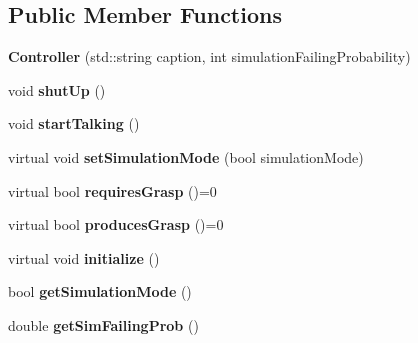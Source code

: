 \subsection*{Public Member Functions}
\begin{DoxyCompactItemize}
\item 
\hypertarget{classkukadu_1_1Controller_a127838e5505d9d35c68da8d95b9d1cda}{{\bfseries Controller} (std\-::string caption, int simulation\-Failing\-Probability)}\label{classkukadu_1_1Controller_a127838e5505d9d35c68da8d95b9d1cda}

\item 
\hypertarget{classkukadu_1_1Controller_aa27eb73a93a2d59bc0ebe15baf28bea0}{void {\bfseries shut\-Up} ()}\label{classkukadu_1_1Controller_aa27eb73a93a2d59bc0ebe15baf28bea0}

\item 
\hypertarget{classkukadu_1_1Controller_a1973596dea74a0706e275f044ca190b0}{void {\bfseries start\-Talking} ()}\label{classkukadu_1_1Controller_a1973596dea74a0706e275f044ca190b0}

\item 
\hypertarget{classkukadu_1_1Controller_a888ebe1be866cb19e4c8f50eaded5bb9}{virtual void {\bfseries set\-Simulation\-Mode} (bool simulation\-Mode)}\label{classkukadu_1_1Controller_a888ebe1be866cb19e4c8f50eaded5bb9}

\item 
\hypertarget{classkukadu_1_1Controller_aed75e7ede2b67b1803778c6f5f1eb7f7}{virtual bool {\bfseries requires\-Grasp} ()=0}\label{classkukadu_1_1Controller_aed75e7ede2b67b1803778c6f5f1eb7f7}

\item 
\hypertarget{classkukadu_1_1Controller_a181338e971e48966d434c523a7ba5da4}{virtual bool {\bfseries produces\-Grasp} ()=0}\label{classkukadu_1_1Controller_a181338e971e48966d434c523a7ba5da4}

\item 
\hypertarget{classkukadu_1_1Controller_a74a2a16a16104b1bf16ad5eae443e968}{virtual void {\bfseries initialize} ()}\label{classkukadu_1_1Controller_a74a2a16a16104b1bf16ad5eae443e968}

\item 
\hypertarget{classkukadu_1_1Controller_a868b762c6bf33afe14c27dd12806972d}{bool {\bfseries get\-Simulation\-Mode} ()}\label{classkukadu_1_1Controller_a868b762c6bf33afe14c27dd12806972d}

\item 
\hypertarget{classkukadu_1_1Controller_a97ffde82f967a920ddc5efb1c5700b2a}{double {\bfseries get\-Sim\-Failing\-Prob} ()}\label{classkukadu_1_1Controller_a97ffde82f967a920ddc5efb1c5700b2a}


\end{DoxyCompactItemize}
